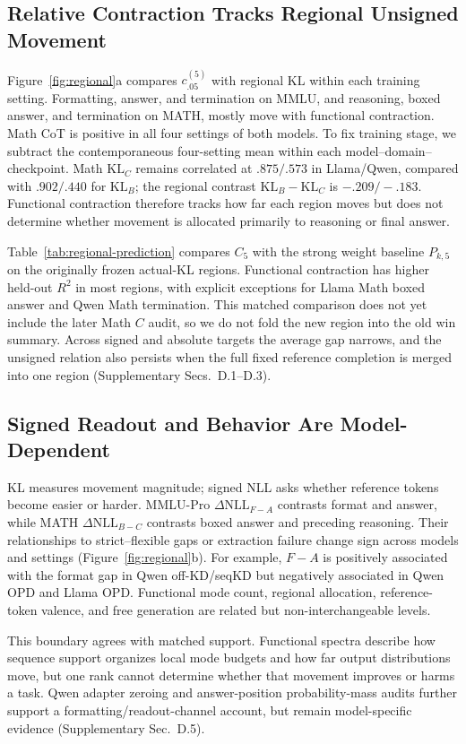 \subsection{Relative Contraction Tracks Regional Unsigned Movement}

Figure~\ref{fig:regional}a compares $c_{.05}^{(5)}$ with regional KL within each training
setting. Formatting, answer, and termination on MMLU, and reasoning, boxed answer, and
termination on MATH, mostly move with functional contraction. Math CoT is positive in
all four settings of both models. To fix training stage, we subtract the contemporaneous
four-setting mean within each model--domain--checkpoint. Math $\mathrm{KL}_C$ remains
correlated at $.875/.573$ in Llama/Qwen, compared with $.902/.440$ for
$\mathrm{KL}_B$; the regional contrast $\mathrm{KL}_B-\mathrm{KL}_C$ is
$-.209/-.183$. Functional contraction therefore tracks how far each region moves but
does not determine whether movement is allocated primarily to reasoning or final answer.

Table~\ref{tab:regional-prediction} compares $C_5$ with the strong weight baseline
$P_{k,5}$ on the originally frozen actual-KL regions. Functional contraction has higher
held-out $R^2$ in most regions, with explicit exceptions for Llama Math boxed answer and
Qwen Math termination. This matched comparison does not yet include the later Math $C$
audit, so we do not fold the new region into the old win summary. Across signed and
absolute targets the average gap narrows, and the unsigned relation also persists when
the full fixed reference completion is merged into one region (Supplementary
Secs.~D.1--D.3).

\subsection{Signed Readout and Behavior Are Model-Dependent}

KL measures movement magnitude; signed NLL asks whether reference tokens become easier
or harder. MMLU-Pro $\Delta\mathrm{NLL}_{F-A}$ contrasts format and answer, while MATH
$\Delta\mathrm{NLL}_{B-C}$ contrasts boxed answer and preceding reasoning. Their
relationships to strict--flexible gaps or extraction failure change sign across models
and settings (Figure~\ref{fig:regional}b). For example, $F-A$ is positively associated
with the format gap in Qwen off-KD/seqKD but negatively associated in Qwen OPD and Llama
OPD. Functional mode count, regional allocation, reference-token valence, and free
generation are related but non-interchangeable levels.

This boundary agrees with matched support. Functional spectra describe how sequence
support organizes local mode budgets and how far output distributions move, but one rank
cannot determine whether that movement improves or harms a task. Qwen adapter zeroing
and answer-position probability-mass audits further support a formatting/readout-channel
account, but remain model-specific evidence (Supplementary Sec.~D.5).
